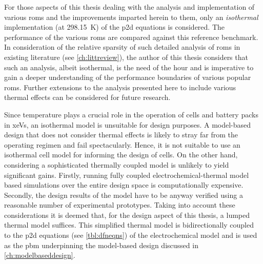 For those aspects of this thesis dealing with the analysis and implementation of
various  \glspl{rom} and  the  improvements  imparted herein  to  them, only  an
\emph{isothermal}  implementation  (at  \SI{298.15}{\kelvin}) of  the  \gls{p2d}
equations  is  considered.  The  performance  of  the  various  \glspl{rom}  are
compared  against this  reference benchmark.  In consideration  of the  relative
sparsity of  such detailed analysis  of \glspl{rom} in existing  literature (see
\cref{ch:littreview}),  the  author  of  this  thesis  considers  that  such  an
analysis, albeit isothermal, is  the need of the hour and  is imperative to gain
a  deeper  understanding  of  the  performance  boundaries  of  various  popular
\glspl{rom}.  Further  extensions to  the  analysis  presented here  to  include
various thermal effects can be considered for future research.

Since temperature  plays a crucial  role in the  operation of cells  and battery
packs in \glspl{xeV},  an isothermal model is unsuitable for  design purposes. A
model-based design that does not consider thermal effects is likely to stray far
from the operating regimen and fail  spectacularly. Hence, it is not suitable to
use an  isothermal cell model  for informing the design  of cells. On  the other
hand, considering a  sophisticated thermally coupled model is  unlikely to yield
significant gains. Firstly, running  fully coupled electrochemical-thermal model
based simulations  over the  entire design  space is  computationally expensive.
Secondly,  the design  results of  the model  have to  be anyway  verified using
a  reasonable  number of  experimental  prototypes.  Taking into  account  these
considerations it is deemed that, for the design aspect of this thesis, a lumped
thermal model suffices. This simplified thermal model is bidirectionally coupled
to the \gls{p2d} equations (see \cref{tbl:dfneqns}) of the electrochemical model
and  is used  as the  \gls{pbm}  underpinning the  model-based design  discussed
in \cref{ch:modelbaseddesign}.




